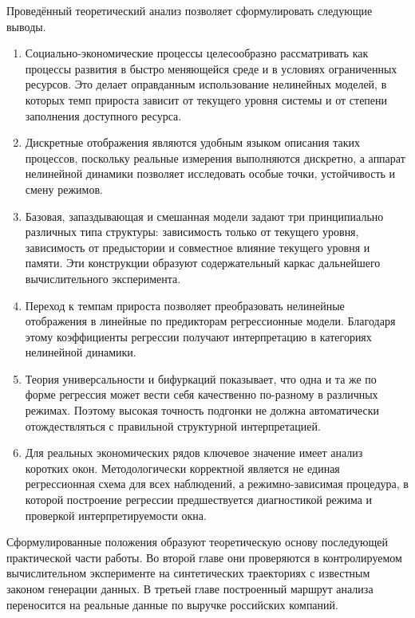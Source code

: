 Проведённый теоретический анализ позволяет сформулировать следующие выводы.

\begin{enumerate}
\item Социально-экономические процессы целесообразно рассматривать как процессы развития в быстро меняющейся среде и в условиях ограниченных ресурсов. Это делает оправданным использование нелинейных моделей, в которых темп прироста зависит от текущего уровня системы и от степени заполнения доступного ресурса.
\item Дискретные отображения являются удобным языком описания таких процессов, поскольку реальные измерения выполняются дискретно, а аппарат нелинейной динамики позволяет исследовать особые точки, устойчивость и смену режимов.
\item Базовая, запаздывающая и смешанная модели задают три принципиально различных типа структуры: зависимость только от текущего уровня, зависимость от предыстории и совместное влияние текущего уровня и памяти. Эти конструкции образуют содержательный каркас дальнейшего вычислительного эксперимента.
\item Переход к темпам прироста позволяет преобразовать нелинейные отображения в линейные по предикторам регрессионные модели. Благодаря этому коэффициенты регрессии получают интерпретацию в категориях нелинейной динамики.
\item Теория универсальности и бифуркаций показывает, что одна и та же по форме регрессия может вести себя качественно по-разному в различных режимах. Поэтому высокая точность подгонки не должна автоматически отождествляться с правильной структурной интерпретацией.
\item Для реальных экономических рядов ключевое значение имеет анализ коротких окон. Методологически корректной является не единая регрессионная схема для всех наблюдений, а режимно-зависимая процедура, в которой построение регрессии предшествуется диагностикой режима и проверкой интерпретируемости окна.
\end{enumerate}

Сформулированные положения образуют теоретическую основу последующей практической части работы. Во второй главе они проверяются в контролируемом вычислительном эксперименте на синтетических траекториях с известным законом генерации данных. В третьей главе построенный маршрут анализа переносится на реальные данные по выручке российских компаний.
